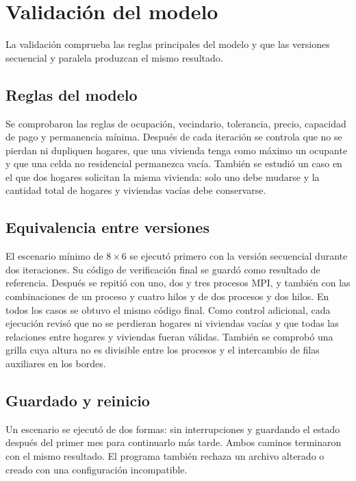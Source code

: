 \section{Validación del modelo}

La validación comprueba las reglas principales del modelo y que las versiones secuencial y paralela produzcan el mismo resultado.

\subsection{Reglas del modelo}

Se comprobaron las reglas de ocupación, vecindario, tolerancia, precio, capacidad de pago y permanencia mínima. Después de cada iteración se controla que no se pierdan ni dupliquen hogares, que una vivienda tenga como máximo un ocupante y que una celda no residencial permanezca vacía. También se estudió un caso en el que dos hogares solicitan la misma vivienda: solo uno debe mudarse y la cantidad total de hogares y viviendas vacías debe conservarse.

\subsection{Equivalencia entre versiones}

El escenario mínimo de $8\times6$ se ejecutó primero con la versión secuencial durante dos iteraciones. Su código de verificación final se guardó como resultado de referencia. Después se repitió con uno, dos y tres procesos MPI, y también con las combinaciones de un proceso y cuatro hilos y de dos procesos y dos hilos. En todos los casos se obtuvo el mismo código final. Como control adicional, cada ejecución revisó que no se perdieran hogares ni viviendas vacías y que todas las relaciones entre hogares y viviendas fueran válidas. También se comprobó una grilla cuya altura no es divisible entre los procesos y el intercambio de filas auxiliares en los bordes.

\subsection{Guardado y reinicio}

Un escenario se ejecutó de dos formas: sin interrupciones y guardando el estado después del primer mes para continuarlo más tarde. Ambos caminos terminaron con el mismo resultado. El programa también rechaza un archivo alterado o creado con una configuración incompatible.
